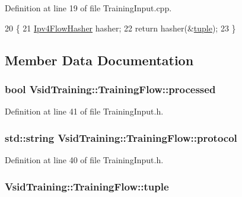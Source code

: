 Definition at line 19 of file Training\-Input.\-cpp.


\begin{DoxyCode}
20 \{
21     \hyperlink{class_vsid_common_1_1_ipv4_flow_hasher}{Ipv4FlowHasher} hasher;
22     \textcolor{keywordflow}{return} hasher(&\hyperlink{class_vsid_training_1_1_training_flow_a687b85a2f6d23cb0ea63f61637df5bcf}{tuple});
23 \}
\end{DoxyCode}


\subsection{Member Data Documentation}
\hypertarget{class_vsid_training_1_1_training_flow_aa9ac4d96ccf3f95e54b7baae9bed6f29}{
\subsubsection[{processed}]{\setlength{\rightskip}{0pt plus 5cm}bool Vsid\-Training\-::\-Training\-Flow\-::processed}}\label{class_vsid_training_1_1_training_flow_aa9ac4d96ccf3f95e54b7baae9bed6f29}


Definition at line 41 of file Training\-Input.\-h.

\hypertarget{class_vsid_training_1_1_training_flow_ac4d53b04d9cbf07636611ad9c6be3b95}{
\subsubsection[{protocol}]{\setlength{\rightskip}{0pt plus 5cm}std\-::string Vsid\-Training\-::\-Training\-Flow\-::protocol}}\label{class_vsid_training_1_1_training_flow_ac4d53b04d9cbf07636611ad9c6be3b95}


Definition at line 40 of file Training\-Input.\-h.

\hypertarget{class_vsid_training_1_1_training_flow_a687b85a2f6d23cb0ea63f61637df5bcf}{
\subsubsection[{tuple}]{ Vsid\-Training\-::\-Training\-Flow\-::tuple}}\label{class_vsid_training_1_1_training_flow_a687b85a2f6d23cb0ea63f61637df5bcf}


